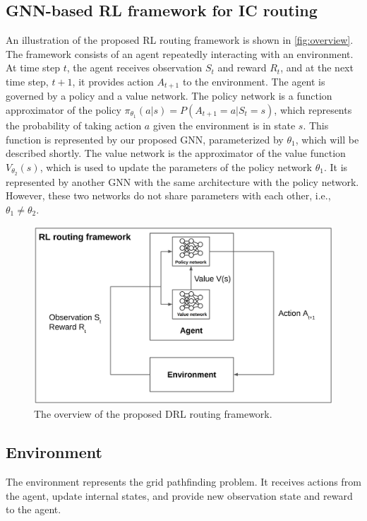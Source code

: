 \documentclass[letterpaper]{article}
\begin{document}
\subsection{GNN-based RL framework for IC routing}
An illustration of the proposed RL routing framework is shown in
\autoref{fig:overview}. The framework consists of an agent repeatedly
interacting with an environment. At time step $t$, the agent receives
observation $S_{t}$ and reward $R_{t}$, and at the next time step, $t+1$, it
provides action $A_{t+1}$ to the environment. The agent is governed by a policy
and a value network. The policy network is a function approximator of the policy
$\pi_{\theta_1}(a|s)=P(A_{t+1}=a|S_{t}=s)$, which represents the probability of
taking action $a$ given the environment is in state $s$. This function is
represented by our proposed GNN, parameterized by $\theta_1$, which will be
described shortly. The value network is the approximator of the value function
$V_{\theta_2}(s)$, which is used to update the parameters of the policy network
$\theta_1$. It is represented by another GNN with the same architecture with the
policy network. However, these two networks do not share parameters with each
other, i.e., $\theta_1\neq\theta_2$. 
\begin{figure}[h!]
    \centering
    \includegraphics[width=\textwidth]{figure/overview.png}
    \caption{The overview of the proposed DRL routing framework.}
    \label{fig:overview}
\end{figure}

\subsection{Environment}
The environment represents the grid pathfinding problem. It receives actions
from the agent, update internal states, and provide new observation state and
reward to the agent.
\end{document}
